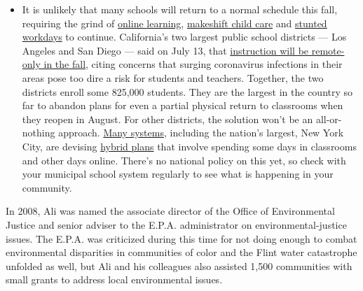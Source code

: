 \begin{itemize}
  \begin{itemize}
  \tightlist
  \item
    It is unlikely that many schools will return to a normal schedule
    this fall, requiring the grind of
    \href{https://www.nytimes3xbfgragh.onion/2020/06/05/us/coronavirus-education-lost-learning.html?action=click\&pgtype=Article\&state=default\&region=MAIN_CONTENT_3\&context=storylines_faq}{online
    learning},
    \href{https://www.nytimes3xbfgragh.onion/2020/05/29/us/coronavirus-child-care-centers.html?action=click\&pgtype=Article\&state=default\&region=MAIN_CONTENT_3\&context=storylines_faq}{makeshift
    child care} and
    \href{https://www.nytimes3xbfgragh.onion/2020/06/03/business/economy/coronavirus-working-women.html?action=click\&pgtype=Article\&state=default\&region=MAIN_CONTENT_3\&context=storylines_faq}{stunted
    workdays} to continue. California's two largest public school
    districts --- Los Angeles and San Diego --- said on July 13, that
    \href{https://www.nytimes3xbfgragh.onion/2020/07/13/us/lausd-san-diego-school-reopening.html?action=click\&pgtype=Article\&state=default\&region=MAIN_CONTENT_3\&context=storylines_faq}{instruction
    will be remote-only in the fall}, citing concerns that surging
    coronavirus infections in their areas pose too dire a risk for
    students and teachers. Together, the two districts enroll some
    825,000 students. They are the largest in the country so far to
    abandon plans for even a partial physical return to classrooms when
    they reopen in August. For other districts, the solution won't be an
    all-or-nothing approach.
    \href{https://bioethics.jhu.edu/research-and-outreach/projects/eschool-initiative/school-policy-tracker/}{Many
    systems}, including the nation's largest, New York City, are
    devising
    \href{https://www.nytimes3xbfgragh.onion/2020/06/26/us/coronavirus-schools-reopen-fall.html?action=click\&pgtype=Article\&state=default\&region=MAIN_CONTENT_3\&context=storylines_faq}{hybrid
    plans} that involve spending some days in classrooms and other days
    online. There's no national policy on this yet, so check with your
    municipal school system regularly to see what is happening in your
    community.
  \end{itemize}
\end{itemize}

In 2008, Ali was named the associate director of the Office of
Environmental Justice and senior adviser to the E.P.A. administrator on
environmental-justice issues. The E.P.A. was criticized during this time
for not doing enough to combat environmental disparities in communities
of color and the Flint water catastrophe unfolded as well, but Ali and
his colleagues also assisted 1,500 communities with small grants to
address local environmental issues.

